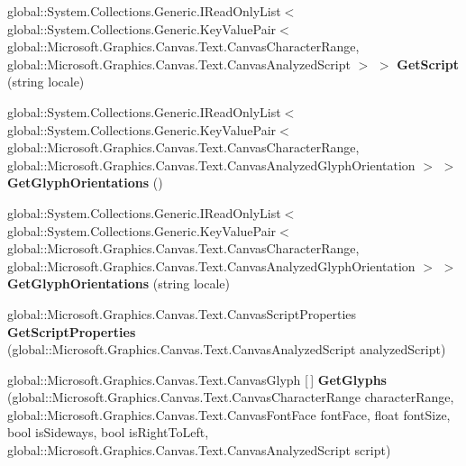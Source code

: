 \begin{DoxyCompactItemize}
global\+::\+System.\+Collections.\+Generic.\+I\+Read\+Only\+List$<$ global\+::\+System.\+Collections.\+Generic.\+Key\+Value\+Pair$<$ global\+::\+Microsoft.\+Graphics.\+Canvas.\+Text.\+Canvas\+Character\+Range, global\+::\+Microsoft.\+Graphics.\+Canvas.\+Text.\+Canvas\+Analyzed\+Script $>$ $>$ {\bfseries Get\+Script} (string locale)
\item 
\mbox{\label{interface_microsoft_1_1_graphics_1_1_canvas_1_1_text_1_1_i_canvas_text_analyzer_a79f1fde65a69de1c7ae6d2697ced5aea}} 
global\+::\+System.\+Collections.\+Generic.\+I\+Read\+Only\+List$<$ global\+::\+System.\+Collections.\+Generic.\+Key\+Value\+Pair$<$ global\+::\+Microsoft.\+Graphics.\+Canvas.\+Text.\+Canvas\+Character\+Range, global\+::\+Microsoft.\+Graphics.\+Canvas.\+Text.\+Canvas\+Analyzed\+Glyph\+Orientation $>$ $>$ {\bfseries Get\+Glyph\+Orientations} ()
\item 
\mbox{\label{interface_microsoft_1_1_graphics_1_1_canvas_1_1_text_1_1_i_canvas_text_analyzer_a47f54cf6a9c8b69d01323558348e4570}} 
global\+::\+System.\+Collections.\+Generic.\+I\+Read\+Only\+List$<$ global\+::\+System.\+Collections.\+Generic.\+Key\+Value\+Pair$<$ global\+::\+Microsoft.\+Graphics.\+Canvas.\+Text.\+Canvas\+Character\+Range, global\+::\+Microsoft.\+Graphics.\+Canvas.\+Text.\+Canvas\+Analyzed\+Glyph\+Orientation $>$ $>$ {\bfseries Get\+Glyph\+Orientations} (string locale)
\item 
\mbox{\label{interface_microsoft_1_1_graphics_1_1_canvas_1_1_text_1_1_i_canvas_text_analyzer_a689cfaece7845a1ac47afa71449b2076}} 
global\+::\+Microsoft.\+Graphics.\+Canvas.\+Text.\+Canvas\+Script\+Properties {\bfseries Get\+Script\+Properties} (global\+::\+Microsoft.\+Graphics.\+Canvas.\+Text.\+Canvas\+Analyzed\+Script analyzed\+Script)
\item 
\mbox{\label{interface_microsoft_1_1_graphics_1_1_canvas_1_1_text_1_1_i_canvas_text_analyzer_ae275ea97283c83f61364e0b52c92e782}} 
global\+::\+Microsoft.\+Graphics.\+Canvas.\+Text.\+Canvas\+Glyph \mbox{[}$\,$\mbox{]} {\bfseries Get\+Glyphs} (global\+::\+Microsoft.\+Graphics.\+Canvas.\+Text.\+Canvas\+Character\+Range character\+Range, global\+::\+Microsoft.\+Graphics.\+Canvas.\+Text.\+Canvas\+Font\+Face font\+Face, float font\+Size, bool is\+Sideways, bool is\+Right\+To\+Left, global\+::\+Microsoft.\+Graphics.\+Canvas.\+Text.\+Canvas\+Analyzed\+Script script)

\end{DoxyCompactItemize}
